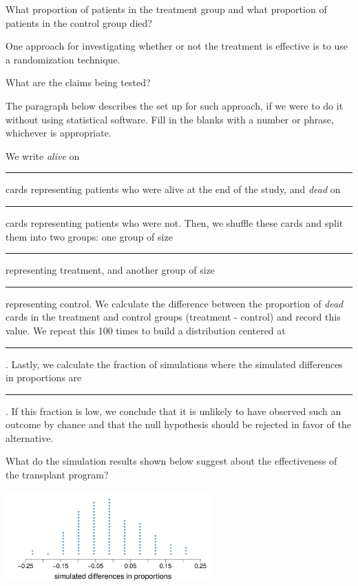 {\begin{parts}
\item What proportion of patients in the treatment group and what proportion of 
patients in the control group died?
\item One approach for investigating whether or not the treatment is effective 
is to use a randomization technique.
\begin{subparts}
\item What are the claims being tested?
\item The paragraph below describes the set up for such approach, if we were 
to do it without using statistical software. Fill in the blanks with a number 
or phrase, whichever is appropriate.
\begin{adjustwidth}{2em}{2em}
We write \textit{alive} on \rule{2cm}{0.5pt} cards representing patients who were 
alive at the end of the study, and \textit{dead} on \rule{2cm}{0.5pt} cards 
representing patients who were not. Then, we shuffle these cards and split them 
into two groups: one group of size \rule{2cm}{0.5pt} representing treatment, and 
another group of size \rule{2cm}{0.5pt} representing control. We calculate the 
difference between the proportion of \textit{dead} cards in the treatment and 
control groups (treatment - control) and record this value. We repeat this 100 
times to build a distribution centered at \rule{2cm}{0.5pt}. Lastly, we calculate 
the fraction of simulations where the simulated differences in proportions are 
\rule{2cm}{0.5pt}. If this fraction is low, we conclude that it is unlikely to 
have observed such an outcome by chance and that the null hypothesis should 
be rejected in favor of the alternative.
\end{adjustwidth}
\item What do the simulation results shown below suggest about the effectiveness 
of the transplant program?
\end{subparts}
\end{parts}
\begin{center}
\includegraphics[width= 0.6\textwidth]{ch_summarizing_data/figures/eoce/randomization_heart_transplants/randomization_heart_transplants_rando.pdf}
\end{center}
}{}
